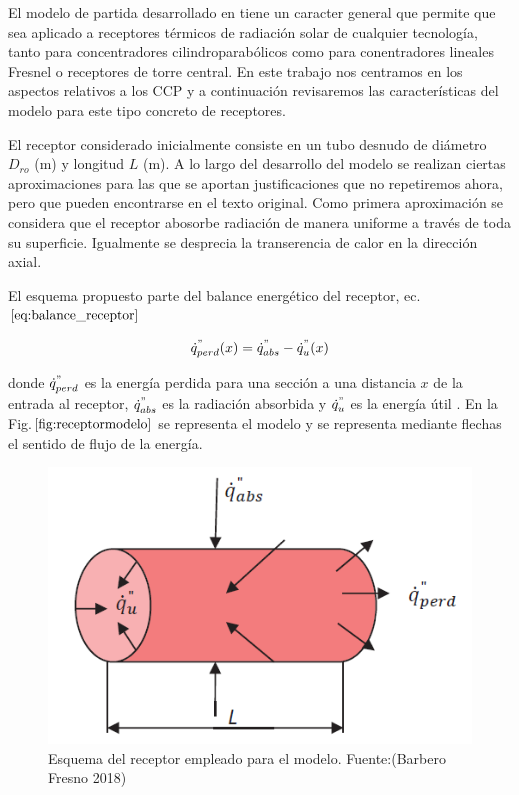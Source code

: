 \documentclass[11pt]{article}
\begin{document}
El modelo de partida desarrollado en \cite{1022085/7TD8VTGL} tiene un
caracter general que permite que sea aplicado a receptores térmicos de
radiación solar de cualquier tecnología, tanto para concentradores
cilindroparabólicos como para conentradores lineales Fresnel o
receptores de torre central. En este trabajo nos centramos en los
aspectos relativos a los CCP y a continuación revisaremos las
características del modelo para este tipo concreto de receptores.

El receptor considerado inicialmente consiste en un tubo desnudo de
diámetro \(D_{ro}\) (m) y longitud \(L\) (m). A lo largo del desarrollo
del modelo se realizan ciertas aproximaciones para las que se aportan
justificaciones que no repetiremos ahora, pero que pueden encontrarse en
el texto original. Como primera aproximación se considera que el
receptor abosorbe radiación de manera uniforme a través de toda su
superficie. Igualmente se desprecia la transerencia de calor en la
dirección axial.

El esquema propuesto parte del balance energético del receptor,
ec.\(\eqref{eq:balance_receptor}\)

\begin{equation}
    \dot{q}^{"}_{perd}(x) = \dot{q}^{"}_{abs}-\dot{q}^{"}_{u}(x) \label{eq:balance_receptor}
\end{equation}

donde \(\dot{q}^{"}_{perd}\) es la energía perdida para una sección a
una distancia \(x\) de la entrada al receptor, \(\dot{q}^{"}_{abs}\) es
la radiación absorbida y \(\dot{q}^{"}_{u}\) es la energía útil . En la
Fig.\(\ref{fig:receptormodelo}\) se representa el modelo y se representa
mediante flechas el sentido de flujo de la energía.

\begin{figure}
\includegraphics[scale=0.8]{images/receptor_para_modelo.png}
\centering
\caption{Esquema del receptor empleado para el modelo. Fuente:(Barbero Fresno 2018)} 
\label{fig:receptormodelo}
\end{figure}
\end{document}

